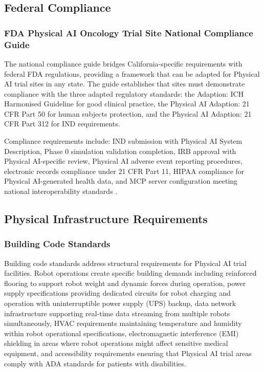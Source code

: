 \subsection{Federal Compliance}
\label{subsec:site-federal}

\subsubsection{FDA Physical AI Oncology Trial Site National Compliance Guide}

The national compliance guide bridges California-specific requirements with
federal FDA regulations, providing a framework that can be adapted for Physical
AI trial sites in any state. The guide establishes that sites must demonstrate
compliance with the three adapted regulatory standards: the Adaption: ICH
Harmonised Guideline \cite{ich-adapt} for good clinical practice, the Physical
AI Adaption: 21 CFR Part 50 \cite{cfr50-adapt} for human subjects protection,
and the Physical AI Adaption: 21 CFR Part 312 \cite{cfr312-adapt} for IND
requirements.

Compliance requirements include: IND submission with Physical AI System
Description, Phase 0 simulation validation completion, IRB approval with
Physical AI-specific review, Physical AI adverse event reporting procedures,
electronic records compliance under 21 CFR Part 11, HIPAA \cite{hipaa}
compliance for Physical AI-generated health data, and MCP server configuration
meeting national interoperability standards \cite{national-mcp-paper}.

\subsection{Physical Infrastructure Requirements}
\label{subsec:site-infrastructure}

\subsubsection{Building Code Standards}

Building code standards address structural requirements for Physical AI trial
facilities. Robot operations create specific building demands including
reinforced flooring to support robot weight and dynamic forces during
operation, power supply specifications providing dedicated circuits for robot
charging and operation with uninterruptible power supply (UPS) backup, data
network infrastructure supporting real-time data streaming from multiple robots
simultaneously, HVAC requirements maintaining temperature and humidity within
robot operational specifications, electromagnetic interference (EMI) shielding
in areas where robot operations might affect sensitive medical equipment, and
accessibility requirements ensuring that Physical AI trial areas comply with
ADA standards for patients with disabilities.

